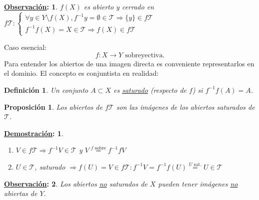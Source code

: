 \documentclass[10pt,a4paper,openright]{book}
\theoremstyle{break}
\newtheorem*{defi}{Definición}
\newtheorem*{prop}{Proposición}
\newtheorem*{demo}{\underline{Demostración}:}
\newtheorem*{obs}{\underline{Observación}:}
\begin{document}
\begin{obs}
$f\left( X \right)$ es abierto y cerrado en $f\mathcal{T}: \begin{cases}
    \forall y \in Y \setminus f\left( X \right), f^{-1}y = \emptyset \in \mathcal{T} \Rightarrow \{y\} \in f\mathcal{T}\\
    f^{-1}f\left( X \right) = X \in \mathcal{T} \Rightarrow f\left( X \right) \in f\mathcal{T}
\end{cases}$
\end{obs}

Caso esencial:
\[
\boxed{f: X \rightarrow Y \text{ sobreyectiva}.} 
\]
Para entender los abiertos de una imagen directa es conveniente representarlos en el dominio. El concepto es conjuntista en realidad:

\begin{defi}
Un conjunto $A \subset X$ es \underline{saturado} (respecto de $f$) si $f^{-1}f\left( A \right) = A$.
\end{defi}
\begin{prop}
Los abiertos de $f\mathcal{T}$ son las imágenes de los abiertos saturados de $\mathcal{T}$.    
\end{prop}
\begin{demo}
\begin{enumerate}
    \item $V \in f\mathcal{T} \Rightarrow f^{-1}V \in \mathcal{T}$ y $V \stackrel{f \text{ sobre}}{=} f^{-1}fV$
    \item $U \in \mathcal{T}$, saturado $\Rightarrow f\left( U \right) = V \in f\mathcal{T}: f^{-1}V = f^{-1}f\left( U \right) \stackrel{U \text{ sat.}}{=} U \in \mathcal{T}$
\end{enumerate}
\end{demo}

\begin{obs}
Los abiertos \underline{no} saturados de $X$ pueden tener imágenes \underline{no} abiertas de $Y$. 
\end{obs}
\end{document}
